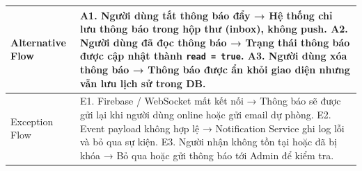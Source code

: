 \begin{longtable}{|>{\raggedright\arraybackslash}p{4cm}|>{\raggedright\arraybackslash}p{11cm}|}
\hline
Alternative Flow & A1. Người dùng tắt thông báo đẩy → Hệ thống chỉ lưu thông báo trong hộp thư (inbox), không push. \newline A2. Người dùng đã đọc thông báo → Trạng thái thông báo được cập nhật thành \texttt{read = true}. \newline A3. Người dùng xóa thông báo → Thông báo được ẩn khỏi giao diện nhưng vẫn lưu lịch sử trong DB. \\
\hline
Exception Flow & E1. Firebase / WebSocket mất kết nối → Thông báo sẽ được gửi lại khi người dùng online hoặc gửi email dự phòng. \newline E2. Event payload không hợp lệ → Notification Service ghi log lỗi và bỏ qua sự kiện. \newline E3. Người nhận không tồn tại hoặc đã bị khóa → Bỏ qua hoặc gửi thông báo tới Admin để kiểm tra. \\
\hline
\end{longtable}
